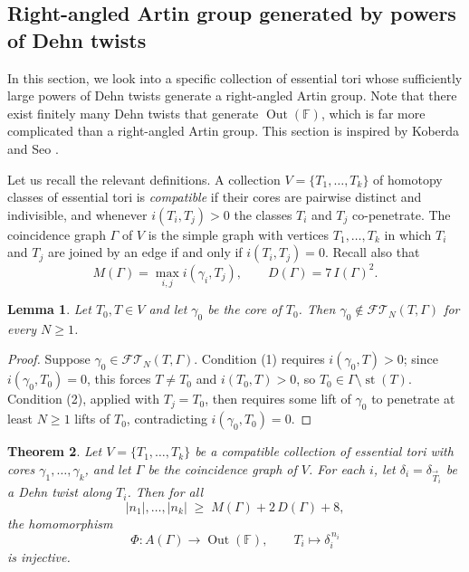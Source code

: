 \documentclass[12pt,a4paper]{amsart}
\numberwithin{equation}{section}
\DeclareMathOperator{\Out}{Out}
\newcommand{\FF}{\mathbb{F}}
\theoremstyle{plain}
\newtheorem{theorem}{Theorem}[section]
\newtheorem{lemma}[theorem]{Lemma}
\theoremstyle{definition}
\theoremstyle{remark}
\begin{document}
\subsection{Right-angled Artin group generated by powers of Dehn twists}

In this section, we look into a specific collection of essential tori whose sufficiently large powers of Dehn twists generate a right-angled Artin group.
Note that there exist finitely many Dehn twists that generate $\Out(\FF)$, which is far more complicated than a right-angled Artin group.
This section is inspired by Koberda \cite{MR3000498} and Seo \cite{MR4299673}.

Let us recall the relevant definitions.
A collection $V = \{T_1, \dots, T_k\}$ of homotopy classes of essential tori is \emph{compatible} if their cores are pairwise distinct and indivisible, and whenever $i(T_i, T_j) > 0$ the classes $T_i$ and $T_j$ co-penetrate.
The coincidence graph $\Gamma$ of $V$ is the simple graph with vertices $T_1, \dots, T_k$ in which $T_i$ and $T_j$ are joined by an edge if and only if $i(T_i, T_j) = 0$.
Recall also that
\[
    M(\Gamma) = \max_{i, j} i(\gamma_i, T_j),
    \qquad
    D(\Gamma) = 7 \, I(\Gamma)^2 .
\]

\begin{lemma} \label{lem:core_not_fellow}
    Let $T_0, T \in V$ and let $\gamma_0$ be the core of $T_0$.
    Then $\gamma_0 \notin \mathcal{FT}\!_N(T, \Gamma)$ for every $N \ge 1$.
\end{lemma}

\begin{proof}
    Suppose $\gamma_0 \in \mathcal{FT}\!_N(T, \Gamma)$.
    Condition (1) requires $i(\gamma_0, T) > 0$; since $i(\gamma_0, T_0) = 0$, this forces $T \ne T_0$ and $i(T_0, T) > 0$, so $T_0 \in \Gamma \setminus \operatorname{st}(T)$.
    Condition (2), applied with $T_j = T_0$, then requires some lift of $\gamma_0$ to penetrate at least $N \ge 1$ lifts of $T_0$, contradicting $i(\gamma_0, T_0) = 0$.
\end{proof}

\begin{theorem} \label{thm:main}
    Let $V = \{ T_1, \dots, T_k \}$ be a compatible collection of essential tori with cores $\gamma_1, \dots, \gamma_k$, and let $\Gamma$ be the coincidence graph of $V$.
    For each $i$, let $\delta_i = \delta_{\vec{T}_i}$ be a Dehn twist along $T_i$.
    Then for all
    \[
        \lvert n_1 \rvert, \dots, \lvert n_k \rvert \;\ge\; M(\Gamma) + 2\, D(\Gamma) + 8,
    \]
    the homomorphism
    \[
        \Phi \colon A(\Gamma) \longrightarrow \Out(\FF), \qquad T_i \longmapsto \delta_i^{\,n_i}
    \]
    is injective.
\end{theorem}
\end{document}
